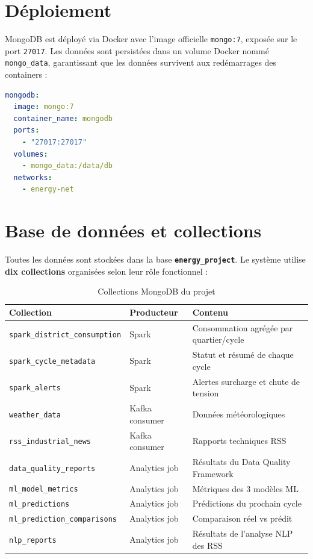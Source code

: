 \documentclass[12pt,a4paper]{report}
\begin{document}
\section{Déploiement}

MongoDB est déployé via Docker avec l'image officielle \texttt{mongo:7}, exposée sur
le port \texttt{27017}. Les données sont persistées dans un volume Docker nommé
\texttt{mongo\_data}, garantissant que les données survivent aux redémarrages des containers :

\begin{lstlisting}[language=yaml, caption={Configuration MongoDB dans Docker Compose}]
mongodb:
  image: mongo:7
  container_name: mongodb
  ports:
    - "27017:27017"
  volumes:
    - mongo_data:/data/db
  networks:
    - energy-net
\end{lstlisting}

\section{Base de données et collections}

Toutes les données sont stockées dans la base \textbf{\texttt{energy\_project}}.
Le système utilise \textbf{dix collections} organisées selon leur rôle fonctionnel :

\begin{table}[H]
\centering
\renewcommand{\arraystretch}{1.4}
\begin{tabular}{|l|l|l|}
\hline
\textbf{Collection} & \textbf{Producteur} & \textbf{Contenu} \\
\hline
\texttt{spark\_district\_consumption} & Spark & Consommation agrégée par quartier/cycle \\
\hline
\texttt{spark\_cycle\_metadata} & Spark & Statut et résumé de chaque cycle \\
\hline
\texttt{spark\_alerts} & Spark & Alertes surcharge et chute de tension \\
\hline
\texttt{weather\_data} & Kafka consumer & Données météorologiques \\
\hline
\texttt{rss\_industrial\_news} & Kafka consumer & Rapports techniques RSS \\
\hline
\texttt{data\_quality\_reports} & Analytics job & Résultats du Data Quality Framework \\
\hline
\texttt{ml\_model\_metrics} & Analytics job & Métriques des 3 modèles ML \\
\hline
\texttt{ml\_predictions} & Analytics job & Prédictions du prochain cycle \\
\hline
\texttt{ml\_prediction\_comparisons} & Analytics job & Comparaison réel vs prédit \\
\hline
\texttt{nlp\_reports} & Analytics job & Résultats de l'analyse NLP des RSS \\
\hline
\end{tabular}
\caption{Collections MongoDB du projet}
\label{tab:mongo_collections}
\end{table}
\end{document}

